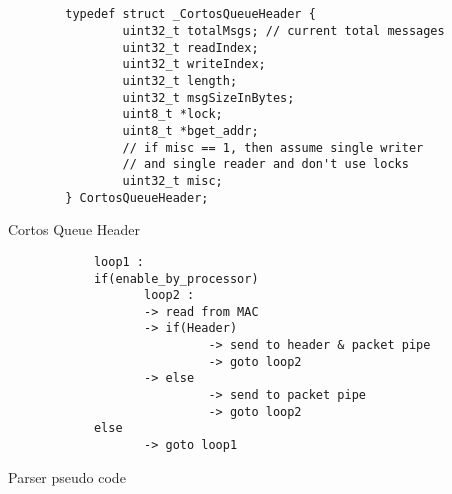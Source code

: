 \appendix
\begin{appendices}
\renewcommand{\thechapter}{\Roman{chapter}}

\iffalse
\chapter{}\label{a1}
\begin{lstlisting}[language=Verilog, caption= tmp code template,label={label:1}] 
module sum(
	input a,b;
	output sum, cout
	);

	assign {cout, sum} = a + b;

endmodule
\end{lstlisting}
\fi

	
\chapter{}
	\begin{algorithm}[htbp]
		\centering
		\begin{verbatim}
		typedef struct _CortosQueueHeader {
		        uint32_t totalMsgs; // current total messages
		        uint32_t readIndex;
		        uint32_t writeIndex;
		        uint32_t length;
		        uint32_t msgSizeInBytes;
		        uint8_t *lock;
		        uint8_t *bget_addr;
		        // if misc == 1, then assume single writer 
		        // and single reader and don't use locks
		        uint32_t misc;
		} CortosQueueHeader;
		\end{verbatim}
		\caption{Cortos Queue Header}
		\label{alg:QueueHDR}
	\end{algorithm}



	\begin{algorithm}[htbp]
		\centering
		\begin{verbatim}
			loop1 :
			if(enable_by_processor)
			       loop2 :
			       -> read from MAC
			       -> if(Header) 
			                -> send to header & packet pipe
			                -> goto loop2
			       -> else
			       	        -> send to packet pipe
			       	        -> goto loop2
			else
			       -> goto loop1
		\end{verbatim}
		\caption{Parser pseudo code}
		\label{alg:ParserCode}
	\end{algorithm}



\end{appendices}
